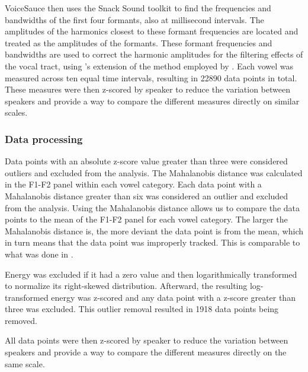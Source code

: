 VoiceSauce then uses the Snack Sound toolkit \citep{sjolanderSnackSoundToolkit2004} to find the frequencies and bandwidths of the first four formants, also at millisecond intervals. The amplitudes of the harmonics closest to these formant frequencies are located and treated as the amplitudes of the formants. These formant frequencies and bandwidths are used to correct the harmonic amplitudes for the filtering effects of the vocal tract, using \citeauthor{iseliAgeSexVowel2007}'s \citeyear{iseliAgeSexVowel2007} extension of the method employed by \citet{hansonGlottalCharacteristicsFemale1997}. Each vowel was measured across ten equal time intervals, resulting in 22890 data points in total. These measures were then z-scored by speaker to reduce the variation between speakers and provide a way to compare the different measures directly on similar scales.

\subsubsection{Data processing} \label{sec:data_processing}
Data points with an absolute z-score value greater than three were considered outliers and excluded from the analysis. The Mahalanobis distance was calculated in the F1-F2 panel within each vowel category. Each data point with a Mahalanobis distance greater than six was considered an outlier and excluded from the analysis. Using the Mahalanobis distance allows us to compare the data points to the mean of the F1-F2 panel for each vowel category. The larger the Mahalanobis distance is, the more deviant the data point is from the mean, which in turn means that the data point was improperly tracked. This is comparable to what was done in \citet{seyfarthPlosiveVoicingAcoustics2018,chaiCheckedSyllablesChecked2022,garellekPhoneticsWhiteHmong2023}.

Energy was excluded if it had a zero value and then logarithmically transformed to normalize its right-skewed distribution. Afterward, the resulting log-transformed energy was z-scored and any data point with a z-score greater than three was excluded. This outlier removal resulted in 1918 data points being removed. 

All data points were then z-scored by speaker to reduce the variation between speakers and provide a way to compare the different measures directly on the same scale.

